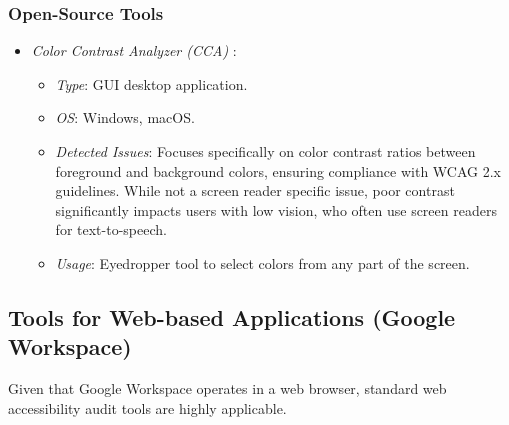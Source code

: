 \subsubsection{Open-Source Tools}
\label{subsubsec:open-source-tools}
\begin{itemize}
    \item \emph{Color Contrast Analyzer (CCA)} \cite{tpgiCCA}:
        \begin{itemize}
            \item \emph{Type}: GUI desktop application.
            \item \emph{OS}: Windows, macOS.
            \item \emph{Detected Issues}: Focuses specifically on color contrast ratios between foreground and background colors, ensuring compliance with WCAG 2.x guidelines. While not a screen reader specific issue, poor contrast significantly impacts users with low vision, who often use screen readers for text-to-speech.
            \item \emph{Usage}: Eyedropper tool to select colors from any part of the screen.
        \end{itemize}
\end{itemize}

\subsection{Tools for Web-based Applications (Google Workspace)}
\label{subsec:web-audit-tools}

Given that Google Workspace operates in a web browser, standard web accessibility audit tools are highly applicable.

